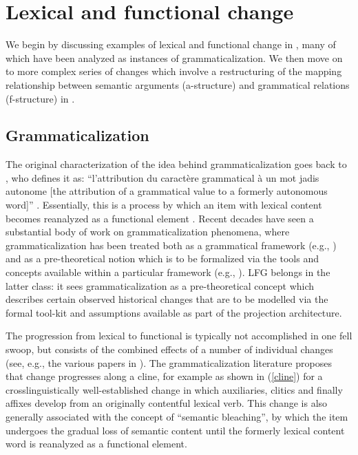 \documentclass[output=paper,hidelinks]{langscibook}
\begin{document}
\section{Lexical and functional change}
\label{sec:Historical:lex-change}
\label{sec:Historical:func-change}

We begin by discussing examples of lexical and functional change in , many of which have been analyzed as instances of grammaticalization.  We then move on to more complex series of changes which involve a restructuring of the mapping relationship between semantic arguments (a-structure) and grammatical relations (f-structure) in .

\subsection{Grammaticalization}
\label{subsect:grmzn}

The original characterization of the idea behind grammaticalization goes back to \citet[131]{meillet12}, who defines it as:  ``l'attribution
du caractère grammatical à un mot jadis autonome [the attribution of a grammatical
value to a formerly autonomous word]'' \citep[134]{vincent2020heads}.  Essentially, this is a process by which an item with lexical content becomes reanalyzed as a functional element \citep{Bybee:Evolution}. Recent  decades have seen a substantial body of work  on grammaticalization phenomena, where grammaticalization has been treated both  as a grammatical framework (e.g., \citealt{lehmann85,hopper_traugott_2003}) and as a pre-theoreti\-cal notion which is to be formalized via the tools and concepts available within a particular framework (e.g., \citealp{campbell2000,Newmeyer2000,robertsroussou03,vangelderen2011}).  LFG belongs in the latter class: it sees grammaticalization as a pre-theoretical concept which describes certain observed historical changes that are to be modelled via the formal tool-kit and assumptions available as part of the projection architecture. 


The progression from lexical to functional is typically not accomplished in one fell swoop, but consists of the combined effects of a number of individual changes (see, e.g., the various papers in \citealp{traugott2010gradience}). The grammaticalization literature proposes that change progresses along a cline, for example as shown in (\ref{cline}) for a crosslinguistically well-established change in which auxiliaries, clitics and finally affixes develop from an originally contentful lexical verb.  This change is also generally associated with the concept of ``semantic bleaching'', by which the item undergoes the gradual loss of semantic content until the formerly lexical content word is reanalyzed as a functional element.  
\end{document}
